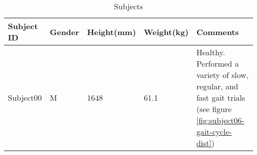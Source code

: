 \begin{table}[ht!]
    \centering
    \caption{Subjects }
    \label{tab:subject-table}
    \small
    \begin{tabular}{>{\raggedright}p{17mm} | p{10mm} p{17mm} p{17mm} | p{40mm}}
        Subject ID  & Gender    & Height(mm)   & Weight(kg)   & Comments\\ \hline
        Subject00   & M         & 1648          & 61.1          & Healthy. Performed a variety of slow, regular, and fast gait trials (see figure \ref{fig:subject06-gait-cycle-dist})\\
    \end{tabular}
\end{table}
